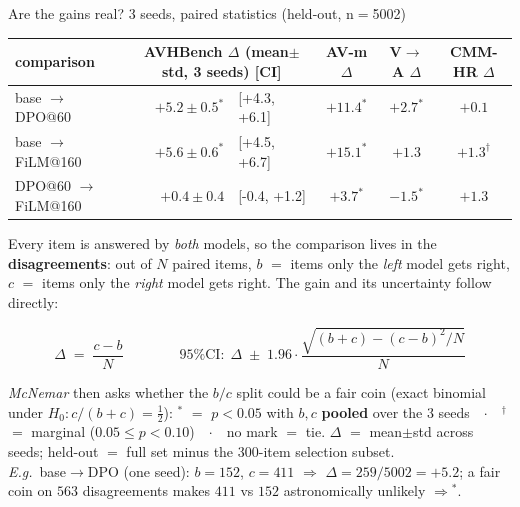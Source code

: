 \documentclass[aspectratio=169,11pt]{beamer}
\begin{document}
\begin{frame}{Are the gains real? 3 seeds, paired statistics (held-out, n$=$5002)}
\centering\footnotesize
\begin{tabular}{l r@{\;}l c c c}
\toprule
comparison & \multicolumn{2}{c}{AVHBench $\Delta$ (mean$\pm$std, 3 seeds) [CI]} & AV-m $\Delta$ & V$\to$A $\Delta$ & CMM-HR $\Delta$ \\
\midrule
base $\to$ DPO@60    & $+5.2\pm 0.5^{*}$ & [{+}4.3, {+}6.1] & $+11.4^{*}$ & $+2.7^{*}$ & $+0.1$ \\
base $\to$ FiLM@160  & $+5.6\pm 0.6^{*}$ & [{+}4.5, {+}6.7] & $+15.1^{*}$ & $+1.3$     & $+1.3^{\dagger}$ \\
DPO@60 $\to$ FiLM@160& $+0.4\pm 0.4$     & [{-}0.4, {+}1.2] & $+3.7^{*}$  & $-1.5^{*}$ & $+1.3$ \\
\bottomrule
\end{tabular}
\vfill
\begin{center}
\begin{minipage}{0.96\textwidth}\footnotesize\raggedright
Every item is answered by \emph{both} models, so the comparison lives in the \textbf{disagreements}:
out of $N$ paired items, $b$ $=$ items only the \emph{left} model gets right, $c$ $=$ items only the
\emph{right} model gets right. The gain and its uncertainty follow directly:
\end{minipage}
\end{center}
\[
\Delta \;=\; \frac{c-b}{N}
\qquad\qquad
\text{95\% CI:}\ \ \Delta \;\pm\; 1.96\cdot\frac{\sqrt{(b+c)-(c-b)^2/N}}{N}
\]
\begin{center}
\begin{minipage}{0.96\textwidth}\footnotesize\raggedright
\emph{McNemar} then asks whether the $b/c$ split could be a fair coin (exact binomial under
$H_0\!: c/(b{+}c){=}\tfrac12$): $^{*}$ $=$ $p<0.05$ with $b,c$ \textbf{pooled} over the 3 seeds\ \
$\cdot$\ \ $^{\dagger}$ $=$ marginal ($0.05\le p<0.10$)\ \ $\cdot$\ \ no mark $=$ tie.\quad
$\Delta$ $=$ mean$\pm$std across seeds; held-out $=$ full set minus the 300-item selection subset.\\
\emph{E.g.}\ base$\to$DPO (one seed): $b{=}152$, $c{=}411$ $\Rightarrow$
$\Delta = 259/5002 = +5.2$; a fair coin on $563$ disagreements makes $411$ vs $152$ astronomically
unlikely $\Rightarrow{}^{*}$.
\end{minipage}
\end{center}
\end{frame}
\end{document}
